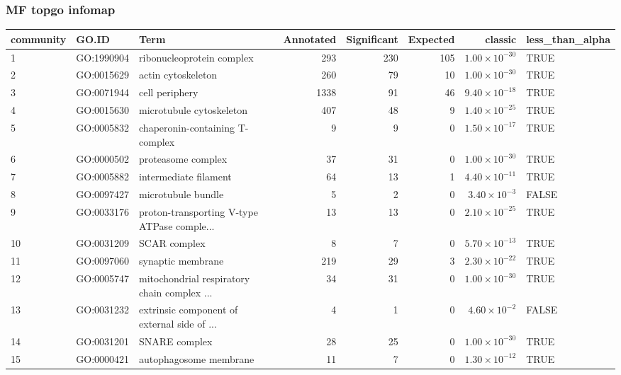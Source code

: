 \subsubsection{MF topgo infomap}
\begin{table}[ht]
\centering
\begin{adjustbox}{max width=\textwidth}
\begin{tabular}{lllrrrrl}
  \hline
community & GO.ID & Term & Annotated & Significant & Expected & classic & less\_than\_alpha \\ 
  \hline
1 & GO:1990904 & ribonucleoprotein complex & 293 & 230 & 105 & $1.00 \times 10^{-30}$ & TRUE \\ 
  2 & GO:0015629 & actin cytoskeleton & 260 & 79 & 10 & $1.00 \times 10^{-30}$ & TRUE \\ 
  3 & GO:0071944 & cell periphery & 1338 & 91 & 46 & $9.40 \times 10^{-18}$ & TRUE \\ 
  4 & GO:0015630 & microtubule cytoskeleton & 407 & 48 & 9 & $1.40 \times 10^{-25}$ & TRUE \\ 
  5 & GO:0005832 & chaperonin-containing T-complex & 9 & 9 & 0 & $1.50 \times 10^{-17}$ & TRUE \\ 
  6 & GO:0000502 & proteasome complex & 37 & 31 & 0 & $1.00 \times 10^{-30}$ & TRUE \\ 
  7 & GO:0005882 & intermediate filament & 64 & 13 & 1 & $4.40 \times 10^{-11}$ & TRUE \\ 
  8 & GO:0097427 & microtubule bundle & 5 & 2 & 0 & $3.40 \times 10^{-3}$ & FALSE \\ 
  9 & GO:0033176 & proton-transporting V-type ATPase comple... & 13 & 13 & 0 & $2.10 \times 10^{-25}$ & TRUE \\ 
  10 & GO:0031209 & SCAR complex & 8 & 7 & 0 & $5.70 \times 10^{-13}$ & TRUE \\ 
  11 & GO:0097060 & synaptic membrane & 219 & 29 & 3 & $2.30 \times 10^{-22}$ & TRUE \\ 
  12 & GO:0005747 & mitochondrial respiratory chain complex ... & 34 & 31 & 0 & $1.00 \times 10^{-30}$ & TRUE \\ 
  13 & GO:0031232 & extrinsic component of external side of ... & 4 & 1 & 0 & $4.60 \times 10^{-2}$ & FALSE \\ 
  14 & GO:0031201 & SNARE complex & 28 & 25 & 0 & $1.00 \times 10^{-30}$ & TRUE \\ 
  15 & GO:0000421 & autophagosome membrane & 11 & 7 & 0 & $1.30 \times 10^{-12}$ & TRUE \\ 

\end{tabular}
\end{adjustbox}
\end{table}
